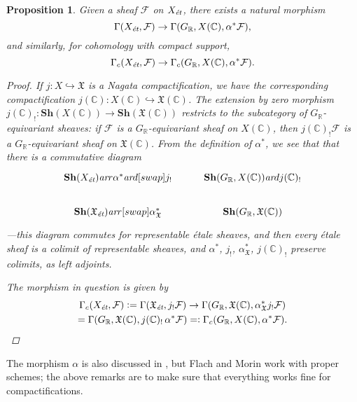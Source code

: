 \documentclass[leqno,12pt]{article}
\theoremstyle{plain}
\newtheorem{proposition}[theorem]{\indent\sc Proposition}
\theoremstyle{definition}
\newcommand{\CC}{\mathbb{C}}
\newcommand{\RR}{\mathbb{R}}
\newcommand{\dfn}{\mathrel{\mathop:}=}
\newcommand{\rdfn}{=\mathrel{\mathop:}}
\newcommand{\ar}{\text{\it ar}}
\newcommand{\et}{\text{\it \'{e}t}}
\begin{document}
\begin{proposition}
  \label{prop:inverse-image-gamma}
  Given a sheaf $\mathcal{F}$ on $X_\et$, there exists a natural morphism
  $$\Gamma (X_\et, \mathcal{F}) \to \Gamma (G_\RR, X (\CC), \alpha^* \mathcal{F}),$$
  and similarly, for cohomology with compact support,
  $$\Gamma_c (X_\et, \mathcal{F}) \to \Gamma_c (G_\RR, X (\CC), \alpha^* \mathcal{F}).$$

  \begin{proof}
    If $j\colon X \hookrightarrow \mathfrak{X}$ is a Nagata compactification, we
    have the corresponding compactification
    $j (\CC)\colon X (\CC) \hookrightarrow \mathfrak{X} (\CC)$. The extension by
    zero morphism
    $j (\CC)_!\colon \mathbf{Sh} (X (\CC)) \to \mathbf{Sh} (\mathfrak{X} (\CC))$
    restricts to the subcategory of $G_\RR$-equivariant sheaves: if
    $\mathcal{F}$ is a $G_\RR$-equivariant sheaf on $X (\CC)$, then
    $j (\CC)_!  \mathcal{F}$ is a $G_\RR$-equivariant sheaf on
    $\mathfrak{X} (\CC)$. From the definition of $\alpha^*$, we see that that
    there is a commutative diagram
    \[ \begin{tikzcd}
        \mathbf{Sh} (X_\et) \ar{r}{\alpha^*}\ar{d}[swap]{j_!} & \mathbf{Sh} (G_\RR, X (\CC)) \ar{d}{j (\CC)_!} \\
        \mathbf{Sh} (\mathfrak{X}_\et) \ar{r}[swap]{\alpha^*_\mathfrak{X}} & \mathbf{Sh} (G_\RR, \mathfrak{X} (\CC))
      \end{tikzcd} \]
    ---this diagram commutes for representable \'{e}tale sheaves, and then every
    \'{e}tale sheaf is a colimit of representable sheaves, and $\alpha^*$,
    $j_!$, $\alpha^*_\mathfrak{X}$, $j (\CC)_!$ preserve colimits, as left
    adjoints.

    The morphism in question is given by
    \begin{multline*}
      \Gamma_c (X_\et, \mathcal{F}) \dfn \Gamma (\mathfrak{X}_\et, j_! \mathcal{F}) \to
      \Gamma (G_\RR, \mathfrak{X} (\CC), \alpha^*_\mathfrak{X} j_! \mathcal{F}) \\
      =
      \Gamma (G_\RR, \mathfrak{X} (\CC), j (\CC)_! \, \alpha^* \mathcal{F})
      \rdfn \Gamma_c (G_\RR, X (\CC), \alpha^* \mathcal{F}). \qedhere
    \end{multline*}
  \end{proof}
\end{proposition}

The morphism $\alpha$ is also discussed in \cite[Appendix~A]{Flach-Morin-2018},
but Flach and Morin work with proper schemes; the above remarks are to make sure
that everything works fine for compactifications.
\end{document}
